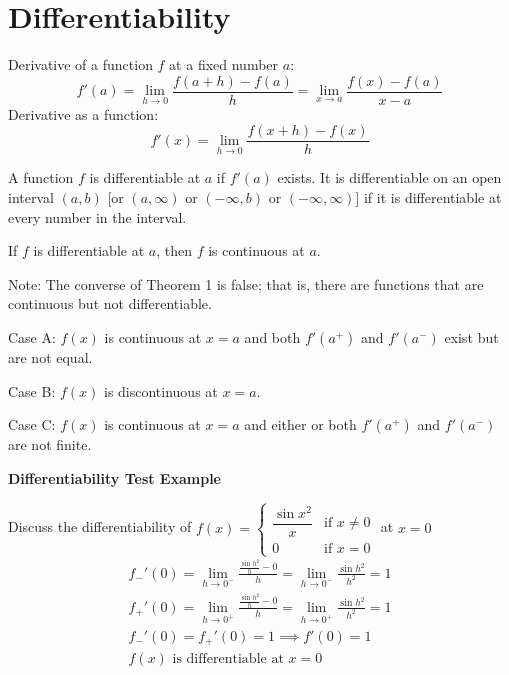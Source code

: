 \documentclass{article}
\newcommand{\theorem}[2]{\begin{tcolorbox}[title={#1},colback=blue!5!white,colframe=blue!75!black,parbox=false] #2 \end{tcolorbox}}
\begin{document}
\section{Differentiability}

\theorem{Derivative of a function}{
Derivative of a function $f$ at a fixed number $a$:
\[
f'(a) = \lim_{h \to 0} \frac{f(a + h) - f(a)}{h} = \lim_{x \to a} \frac{f(x) - f(a)}{x - a}
\]
Derivative as a function:
\[
f'(x) = \lim_{h \to 0} \frac{f(x + h) - f(x)}{h}
\]
}

\theorem{Definition 1}{
A function $f$ is differentiable at $a$ if $f'(a)$ exists. It is differentiable on an open interval $(a, b)$ [or $(a, \infty)$ or $(-\infty, b)$ or $(-\infty, \infty)$] if it is differentiable at every number in the interval.
}

\theorem{Theorem 1 Differentiability implies Continuity}{
If $f$ is differentiable at $a$, then $f$ is continuous at $a$.

Note: The converse of Theorem 1 is false; that is, there are functions that are continuous but not differentiable.
}

\theorem{Reasons for Non-Differentiability}{
Case A: $f(x)$ is continuous at $x = a$ and both $f'(a^+)$ and $f'(a^-)$ exist but are not equal.

Case B: $f(x)$ is discontinuous at $x = a$.

Case C: $f(x)$ is continuous at $x = a$ and either or both $f'(a^+)$ and $f'(a^-)$ are not finite.
}

\textbf{Differentiability Test Example}

Discuss the differentiability of
$f(x)=\begin{cases}
    \dfrac{\sin x^2}{x} &\text{if $x\ne 0$} \\
    0  &\text{if $x=0$}
\end{cases}$ at $x=0$
\begin{gather*}
    f_-'(0)=\lim_{h \to 0^-} \frac{\frac{\sin h^2}{h}-0}{h}=\lim_{h \to 0^-} \frac{\sin h^2}{h^2}=1\\
    f_+'(0)=\lim_{h \to 0^+} \frac{\frac{\sin h^2}{h}-0}{h}=\lim_{h \to 0^+} \frac{\sin h^2}{h^2}=1\\
    f_-'(0)=f_+'(0)=1 \implies f'(0)=1\\
    \boxed{\text{$f(x)$ is differentiable at $x=0$}}
\end{gather*}
\end{document}
